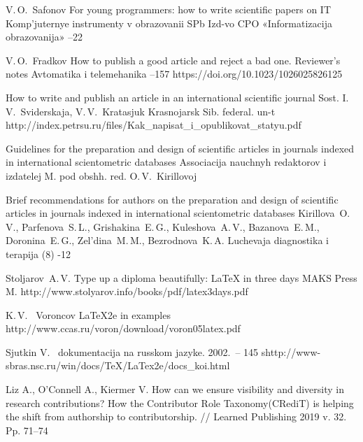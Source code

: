 \documentclass{psta}%
\begin{document}
\maketitle
\begin{thebibliography}{9}


\by V.\,O.~Safonov
\paper For young programmers: how to write scientific papers on IT
\jour Komp'juternye instrumenty v obrazovanii
\publaddr SPb
\publ Izd-vo CPO «Informatizacija obrazovanija»
--22

\by V.\,O.~Fradkov
\paper How to publish a good article and reject a bad one. Reviewer's notes
\jour Avtomatika i telemehanika
--157
\doi https://doi.org/10.1023/1026025826125

\eprint How to write and publish an article in an international scientific journal
\eprintinfo Sost. I.\,V.~Sviderskaja, V.\,V.~Kratasjuk
\publaddr Krasnojarsk
\publ Sib. federal. un-t
\URL http://index.petrsu.ru/files/Kak_napisat_i_opublikovat_statyu.pdf

\eprint Guidelines for the preparation and design of scientific articles in journals indexed in international scientometric databases
\publ Associacija nauchnyh redaktorov i izdatelej
\publaddr M.
\eprintinfo pod obshh. red.  O.\,V.~Kirillovoj

\paper Brief recommendations for authors on the preparation and design of scientific articles in journals indexed in international scientometric databases
\by Kirillova~O.\,V., Parfenova~S.\,L., Grishakina~E.\,G., Kuleshova~A.\,V., Bazanova~E.\,M., Doronina~E.\,G., Zel'dina~M.\,M., Bezrodnova~K.\,A.
\jour Luchevaja diagnostika i terapija
(8)
-12

\by Stoljarov~A.\,V.
\book Type up a diploma beautifully: LaTeX in three days
\publ MAKS Press
\publaddr M.
\URL http://www.stolyarov.info/books/pdf/latex3days.pdf

\by K.\,V.~ Voroncov
\eprint LaTeX2e in examples
\URL http://www.ccas.ru/voron/download/voron05latex.pdf

    Sjutkin V. \LaTeXe\ dokumentacija na russkom jazyke. 2002.~\--- 145 s\URL http://www-sbras.nsc.ru/win/docs/TeX/LaTex2e/docs_koi.html

 Liz A., O’Connell A., Kiermer V. How can we ensure visibility and diversity in research contributions? How the Contributor Role Taxonomy(CRediT) is helping the shift from authorship to contributorship. // Learned Publishing 2019 v. 32. Pp. 71–74 

\end{thebibliography}
\end{document}
